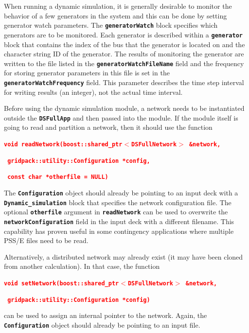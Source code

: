 \documentclass[12pt]{report} %
\begin{document}
When running a dynamic simulation, it is generally desirable to monitor the behavior of a few generators in the system and this can be done by setting generator watch parameters. The \texttt{\textbf{generatorWatch}} block specifies which generators are to be monitored. Each generator is described within a \texttt{\textbf{generator}} block that contains the index of the bus that the generator is located on and the character string ID of the generator. The results of monitoring the generator are written to the file listed in the \texttt{\textbf{generatorWatchFileName}} field and the frequency for storing generator parameters in this file is set in the \texttt{\textbf{generatorWatchFrequency}} field. This parameter describes the time step interval for writing results (an integer), not the actual time interval.

Before using the dynamic simulation module, a network needs to be instantiated outside the \texttt{\textbf{DSFullApp}} and then passed into the module. If the module itself is going to read and partition a network, then it should use the function

\textcolor{red}{\texttt{\textbf{void readNetwork(boost::shared\_ptr$\boldsymbol{\mathrm{<}}$DSFullNetwork$\boldsymbol{\mathrm{>}}$ \&network,}}}

\textcolor{red}{\texttt{\textbf{  gridpack::utility::Configuration *config,}}}

\textcolor{red}{\texttt{\textbf{  const char *otherfile = NULL)}}}

The \texttt{\textbf{Configuration}} object should already be pointing to an input deck with a \texttt{\textbf{Dynamic\_simulation}} block that specifies the network configuration file. The optional \texttt{\textbf{otherfile}} argument in \texttt{\textbf{readNetwork}} can be used to overwrite the \texttt{\textbf{networkConfiguration}} field in the input deck with a different filename. This capability has proven useful in some contingency applications where multiple PSS/E files need to be read.

Alternatively, a distributed network may already exist (it may have been cloned from another calculation). In that case, the function

\textcolor{red}{\texttt{\textbf{void setNetwork(boost::shared\_ptr$\boldsymbol{\mathrm{<}}$DSFullNetwork$\boldsymbol{\mathrm{>}}$ \&network,}}}

\textcolor{red}{\texttt{\textbf{  gridpack::utility::Configuration *config)}}}

can be used to assign an internal pointer to the network. Again, the \texttt{\textbf{Configuration}} object should already be pointing to an input file.
\end{document}
